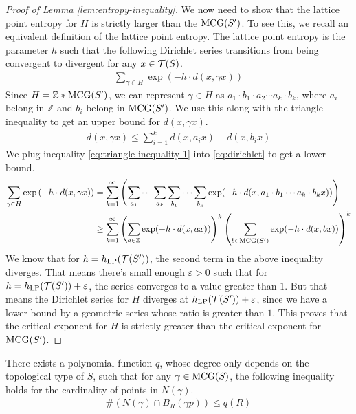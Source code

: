 \documentclass[12pt, reqno]{amsart}
\begin{document}
\begin{proof}[Proof of Lemma \ref{lem:entropy-inequality}]
  We now need to show that the lattice point entropy for $H$ is strictly larger than the $\mathrm{MCG}(S^{\prime})$.
  To see this, we recall an equivalent definition of the lattice point entropy.
  The lattice point entropy is the parameter $h$ such that the following Dirichlet series transitions from being convergent to divergent for any $x \in \mathcal{T}(S)$.
  \begin{align}
    \label{eq:dirichlet}
    \sum_{\gamma \in H} \exp\left( -h \cdot d(x, \gamma x) \right)
  \end{align}
  Since $H = \mathbb{Z} * \mathrm{MCG}(S^{\prime})$, we can represent $\gamma \in H$ as $a_1 \cdot b_1 \cdot a_2 \cdots a_k \cdot b_k$, where $a_i$ belong in $\mathbb{Z}$ and $b_i$ belong in $\mathrm{MCG}(S^{\prime})$.
  We use this along with the triangle inequality to get an upper bound for $d(x, \gamma x)$.
  \begin{align}
    \label{eq:triangle-inequality-1}
    d(x, \gamma x) \leq \sum_{i=1}^k d(x, a_i x) + d(x, b_i x)
  \end{align}
  We plug inequality \eqref{eq:triangle-inequality-1} into \eqref{eq:dirichlet} to get a lower bound.
  \begin{align}
    \label{eq:dirichlet-lower-bound}
    \sum_{\gamma \in H} \exp\left( -h \cdot d(x, \gamma x) \right) &= \sum_{k=1}^\infty \left(  \sum_{a_1}\cdots \sum_{a_k} \sum_{b_1}\cdots \sum_{b_k}  \exp(-h \cdot d(x, a_1 \cdot b_1 \cdots a_k \cdot b_k x)) \right) \\
    &\geq \sum_{k=1}^{\infty} \left( \sum_{a \in \mathbb{Z}} \exp(-h \cdot d(x, ax)) \right)^k \left( \sum_{b \in \mathrm{MCG}(S^{\prime})} \exp(-h \cdot d(x, bx)) \right)^k
  \end{align}
  We know that for $h = h_{\mathrm{LP}}(\mathcal{T}(S^{\prime}))$, the second term in the above inequality diverges.
  That means there's small enough $\varepsilon > 0$ such that for $h = h_{\mathrm{LP}}(\mathcal{T}(S^{\prime})) + \varepsilon$, the series converges to a value greater than $1$.
  But that means the Dirichlet series for $H$ diverges at $h_{\mathrm{LP}}(\mathcal{T}(S^{\prime})) + \varepsilon$, since we have a lower bound by a geometric series whose ratio is greater than $1$.
  This proves that the critical exponent for $H$ is strictly greater than the critical exponent for $\mathrm{MCG}(S^{\prime})$.
\end{proof}

\begin{lemma}
  \label{lem:fd-polynomial-growth}
  There exists a polynomial function $q$, whose degree only depends on the topological type of $S$, such that for any $\gamma \in \mathrm{MCG}(S)$, the following inequality holds for the cardinality of points in $N(\gamma)$.
  \begin{align*}
    \#\left( N(\gamma) \cap B_R(\gamma p) \right) \leq q(R)
  \end{align*}
\end{lemma}
\end{document}

